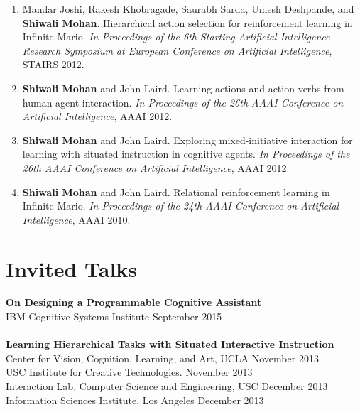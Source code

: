 \documentclass[margin,line,11pt]{res}
\begin{document}
\begin{resume}
\begin{enumerate}[label=\lbrack A\arabic*\rbrack,leftmargin=*]
                  \item Mandar Joshi, Rakesh Khobragade, Saurabh Sarda, Umesh Deshpande, and \textbf{Shiwali Mohan}. Hierarchical
                    action selection for reinforcement learning in Infinite Mario. \emph{In Proceedings of the 6th Starting Artificial
                      Intelligence Research Symposium at European Conference on Artificial Intelligence}, STAIRS 2012.

                  \item \textbf{Shiwali Mohan} and John Laird. Learning actions and action verbs from human-agent interaction. \emph{In
                    Proceedings of the 26th AAAI Conference on Artificial Intelligence}, AAAI 2012.

                  \item \textbf{Shiwali Mohan} and John Laird. Exploring mixed-initiative interaction for learning with situated instruction in cognitive agents. \emph{In Proceedings of the 26th AAAI Conference on Artificial Intelligence}, AAAI 2012.

                  \item \textbf{Shiwali Mohan} and John Laird. Relational reinforcement learning in Infinite Mario. \emph{In Proceedings of the
                    24th AAAI Conference on Artificial Intelligence}, AAAI 2010.
                  \end{enumerate}

                  \section{\sc Invited Talks}
                  \textbf{On Designing a Programmable Cognitive Assistant}\\
                  IBM Cognitive Systems Institute \hfill September 2015 \\
                  \\
                  \textbf{Learning Hierarchical Tasks with Situated Interactive Instruction}\\
                  Center for Vision, Cognition, Learning, and Art, UCLA \hfill November 2013\\
                  USC Institute for Creative Technologies. \hfill November 2013\\
                  Interaction Lab, Computer Science and Engineering, USC \hfill December 2013\\
                  Information Sciences Institute, Los Angeles \hfill December 2013


\end{resume}
\end{document}
